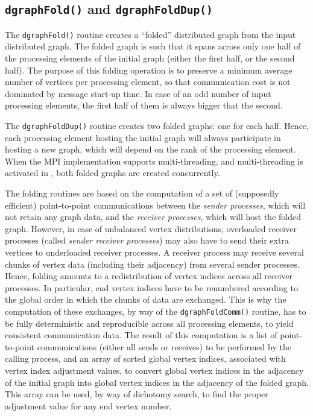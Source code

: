 \subsection{\texttt{dgraphFold()} and \texttt{dgraphFoldDup()}}

The \texttt{dgraph\lbt Fold()} routine creates a ``folded''
distributed graph from the input distributed graph. The folded graph
is such that it spans across only one half of the processing elements
of the initial graph (either the first half, or the second half). The
purpose of this folding operation is to preserve a minimum average
number of vertices per processing element, so that communication cost
is not dominated by message start-up time. In case of an odd number
of input processing elements, the first half of them is always bigger
that the second.

The \texttt{dgraph\lbt Fold\lbt Dup()} routine creates two folded
graphs: one for each half. Hence, each processing element hosting the
initial graph will always participate in hosting a new graph, which
will depend on the rank of the processing element. When the MPI
implementation supports multi-threading, and multi-threading is
activated in \scotch, both folded graphs are created concurrently.

The folding routines are based on the computation of a set of
(supposedly efficient) point-to-point communications between the
\textit{sender processes}, which will not retain any graph data, and
the \textit{receiver processes}, which will host the folded
graph. However, in case of unbalanced vertex distributions, overloaded
receiver processes (called \textit{sender receiver processes}) may
also have to send their extra vertices to underloaded receiver
processes. A receiver process may receive several chunks of vertex
data (including their adjacency) from several sender processes. Hence,
folding amounts to a redistribution of vertex indices across all
receiver processes. In particular, end vertex indices have to be
renumbered according to the global order in which the chunks of data
are exchanged. This is why the computation of these exchanges, by way
of the \texttt{dgraph\lbt Fold\lbt Comm()} routine, has to be fully
deterministic and reproducible across all processing elements, to
yield consistent communication data. The result of this computation
is a list of point-to-point communications (either all sends or
receives) to be performed by the calling process, and an array of
sorted global vertex indices, associated with vertex index adjustment
values, to convert global vertex indices in the adjacency of the
initial graph into global vertex indices in the adjacency of the
folded graph. This array can be used, by way of dichotomy search, to
find the proper adjustment value for any end vertex number.

